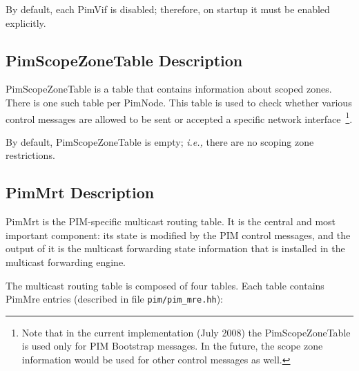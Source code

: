 \documentclass[11pt]{article}
\newcommand{\ie}{\emph{i.e.,}\xspace}
\begin{document}
By default, each PimVif is disabled; therefore, on startup it must be
enabled explicitly. 


\subsection{PimScopeZoneTable Description}

PimScopeZoneTable is a table that contains information about scoped
zones. There is one such table per PimNode. This table is used to check
whether various control messages are allowed to be sent or accepted a
specific network interface~\footnote{Note that in the current implementation
(July 2008) the PimScopeZoneTable is used only for PIM
Bootstrap messages. In the future, the scope zone information would be
used for other control messages as well.}.

By default, PimScopeZoneTable is empty; \ie there are no scoping zone
restrictions.


\subsection{PimMrt Description}

PimMrt is the PIM-specific multicast routing table. It is the central
and most important component: its state is modified by the PIM control
messages, and the output of it is the multicast forwarding state
information that is installed in the multicast forwarding engine.

The multicast routing table is composed of four tables. Each table
contains PimMre entries (described in file \verb=pim/pim_mre.hh=):
\end{document}
